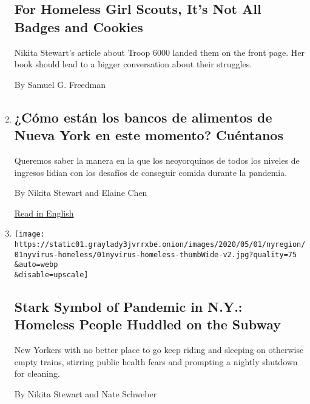 \begin{enumerate}
  \hypertarget{for-homeless-girl-scouts-its-not-all-badges-and-cookies}{%
  \subsection{For Homeless Girl Scouts, It's Not All Badges and
  Cookies}\label{for-homeless-girl-scouts-its-not-all-badges-and-cookies}}

  Nikita Stewart's article about Troop 6000 landed them on the front
  page. Her book should lead to a bigger conversation about their
  struggles.

  By Samuel G. Freedman
\item
  \href{/es/2020/05/13/reader-center/banco-de-alimentos-nueva-york-coronavirus.html}{}

  \hypertarget{cuxf3mo-estuxe1n-los-bancos-de-alimentos-de-nueva-york-en-este-momento-cuuxe9ntanos}{%
  \subsection{¿Cómo están los bancos de alimentos de Nueva York en este
  momento?
  Cuéntanos}\label{cuxf3mo-estuxe1n-los-bancos-de-alimentos-de-nueva-york-en-este-momento-cuuxe9ntanos}}

  Queremos saber la manera en la que los neoyorquinos de todos los
  niveles de ingresos lidian con los desafíos de conseguir comida
  durante la pandemia.

  By Nikita Stewart and Elaine Chen

  \href{https://www.nytimes3xbfgragh.onion/2020/04/22/reader-center/new-york-food-pantry-covid-callout.html}{Read
  in English}
\item
  \href{/2020/05/02/nyregion/coronavirus-nyc-subway-homeless.html}{}

  \texttt{[image: https://static01.graylady3jvrrxbe.onion/images/2020/05/01/nyregion/01nyvirus-homeless/01nyvirus-homeless-thumbWide-v2.jpg?quality=75\\\&auto=webp\\\&disable=upscale]}

  \hypertarget{stark-symbol-of-pandemic-in-ny-homeless-people-huddled-on-the-subway}{%
  \subsection{Stark Symbol of Pandemic in N.Y.: Homeless People Huddled
  on the
  Subway}\label{stark-symbol-of-pandemic-in-ny-homeless-people-huddled-on-the-subway}}

  New Yorkers with no better place to go keep riding and sleeping on
  otherwise empty trains, stirring public health fears and prompting a
  nightly shutdown for cleaning.

  By Nikita Stewart and Nate Schweber
\end{enumerate}

